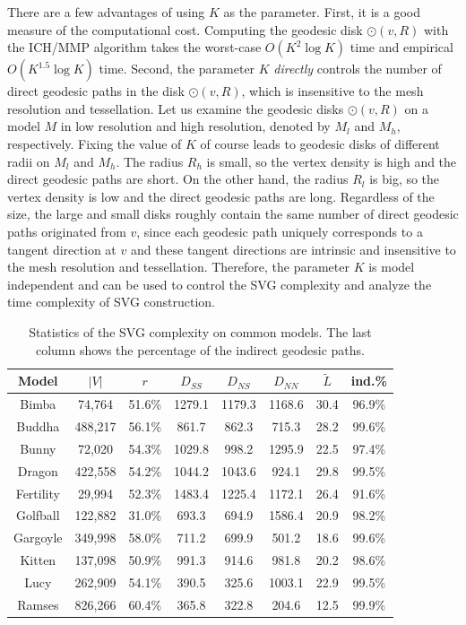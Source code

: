 There are a few advantages of using $K$ as the parameter. First, it
is a good measure of the computational cost. Computing the geodesic
disk $\odot(v,R)$ with the ICH/MMP algorithm takes the worst-case
$O(K^2 \log K)$ time and empirical $O(K^{1.5}\log K)$ time. Second,
the parameter $K$ \textit{directly} controls the number of direct
geodesic paths in the disk $\odot(v,R)$, which is insensitive to the
mesh resolution and tessellation. Let us examine the geodesic disks
$\odot(v,R)$ on a model $M$ in low resolution and high resolution,
denoted by $M_l$ and $M_h$, respectively. Fixing the value of $K$ of
course leads to geodesic disks of different radii on $M_l$ and
$M_h$. The radius $R_h$ is small, so the vertex density is high and
the direct geodesic paths are short. On the other hand, the radius
$R_l$ is big, so the vertex density is low and the direct geodesic
paths are long. Regardless of the size, the large and small disks
roughly contain the same number of direct geodesic paths originated
from $v$, since each geodesic path uniquely corresponds to a tangent
direction at $v$ and these tangent directions are intrinsic and
insensitive to the mesh resolution and tessellation. Therefore, the
parameter $K$ is model independent and can be used to control the
SVG complexity and analyze the time complexity of SVG construction.
\begin{table}[htbp]
\centering
\setlength\tabcolsep{2pt}
\begin{tabular}{|c||c|c|c|c|c|c|c|}
  \hline Model & $|V|$ & $r$ & $D_{SS}$ & $D_{NS}$ & $D_{NN}$ & $\widetilde{L}$ & ind.\% \\
  \hline Bimba & 74,764 & 51.6\% & 1279.1 & 1179.3 & 1168.6 & 30.4 & 96.9\%\\
  \hline Buddha & 488,217 & 56.1\% & 861.7 & 862.3 & 715.3 & 28.2 & 99.6\%\\
  \hline Bunny &  72,020  & 54.3\%  & 1029.8 & 998.2 & 1295.9 & 22.5 & 97.4\%\\
  \hline Dragon & 422,558 &  54.2\% & 1044.2 &  1043.6 &  924.1 & 29.8 & 99.5\%\\
  \hline Fertility & 29,994 &  52.3\% &  1483.4 & 1225.4 &  1172.1 & 26.4 & 91.6\%\\
  \hline Golfball & 122,882 & 31.0\% &  693.3  & 694.9 &  1586.4 & 20.9 & 98.2\%\\
  \hline Gargoyle & 349,998 & 58.0\% &  711.2  & 699.9 &  501.2 & 18.6 & 99.6\%\\
  \hline Kitten & 137,098 &  50.9\% &   991.3  & 914.6 &  981.8 & 20.2 & 98.6\%\\
  \hline Lucy  &  262,909 & 54.1\% & 390.5  & 325.6 &  1003.1 & 22.9 & 99.5\% \\
  \hline Ramses & 826,266 & 60.4\% &  365.8  & 322.8 & 204.6 & 12.5 & 99.9\%\\
  \hline
\end{tabular}
\caption{Statistics of the SVG complexity on common models. The last column shows
the percentage of the indirect geodesic paths.}
\label{tab:SVGcomplexity}
\end{table}



